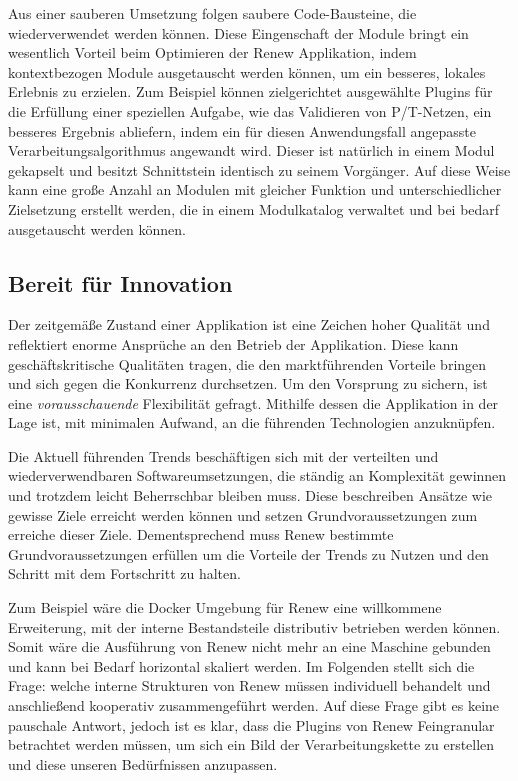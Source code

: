 Aus einer sauberen Umsetzung folgen saubere Code-Bausteine, die wiederverwendet werden können. Diese Eingenschaft der Module bringt ein wesentlich Vorteil beim Optimieren der Renew Applikation, indem kontextbezogen Module ausgetauscht werden können, um ein besseres, lokales Erlebnis zu erzielen. Zum Beispiel können zielgerichtet ausgewählte Plugins für die Erfüllung einer speziellen Aufgabe, wie das Validieren von P/T-Netzen, ein besseres Ergebnis abliefern, indem ein für diesen Anwendungsfall angepasste Verarbeitungsalgorithmus angewandt wird. Dieser ist natürlich in einem Modul gekapselt und besitzt Schnittstein identisch zu seinem Vorgänger. Auf diese Weise kann eine große Anzahl an Modulen mit gleicher Funktion und unterschiedlicher Zielsetzung erstellt werden, die in einem Modulkatalog verwaltet und bei bedarf ausgetauscht werden können. \newpage


\subsection{Bereit für Innovation} \label{sub:moderner_zustand}
Der zeitgemäße Zustand einer Applikation ist eine Zeichen hoher Qualität und reflektiert enorme Ansprüche an den Betrieb der Applikation. Diese kann geschäftskritische Qualitäten tragen, die den marktführenden Vorteile bringen und sich gegen die Konkurrenz durchsetzen. Um den Vorsprung zu sichern, ist eine \textit{vorausschauende} Flexibilität gefragt. Mithilfe dessen die Applikation in der Lage ist, mit minimalen Aufwand, an die führenden Technologien anzuknüpfen. 

Die Aktuell führenden Trends beschäftigen sich mit der verteilten und wiederverwendbaren Softwareumsetzungen, die ständig an Komplexität gewinnen und trotzdem leicht Beherrschbar bleiben muss. Diese beschreiben Ansätze wie gewisse Ziele erreicht werden können und setzen Grundvoraussetzungen zum erreiche dieser Ziele. Dementsprechend muss Renew bestimmte Grundvoraussetzungen erfüllen um die Vorteile der Trends zu Nutzen und den Schritt mit dem Fortschritt zu halten.  \bigbreak


Zum Beispiel wäre die Docker Umgebung für Renew eine willkommene Erweiterung, mit der interne Bestandsteile distributiv betrieben werden können. Somit wäre die Ausführung von Renew nicht mehr an eine Maschine gebunden und kann bei Bedarf horizontal skaliert werden. Im Folgenden stellt sich die Frage: welche interne Strukturen von Renew müssen individuell behandelt und anschließend kooperativ zusammengeführt werden. Auf diese Frage gibt es keine pauschale Antwort, jedoch ist es klar, dass die Plugins von Renew Feingranular betrachtet werden müssen, um sich ein Bild der Verarbeitungskette zu erstellen und diese unseren Bedürfnissen anzupassen. \bigbreak

